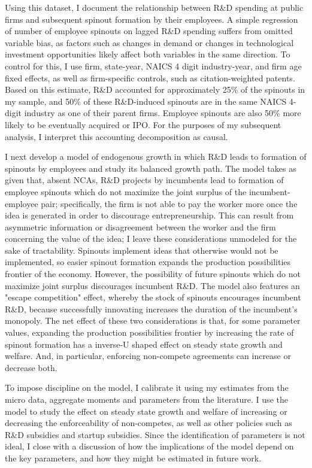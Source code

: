 \documentclass[11pt,english]{article}
\theoremstyle{remark}
\begin{document}
Using this dataset, I document the relationship between R\&D spending at public firms and subsequent spinout formation by their employees. A simple regression of number of employee spinouts on lagged R\&D spending suffers from omitted variable bias, as factors such as changes in demand or changes in technological investment opportunities likely affect both variables in the same direction. To control for this, I use firm, state-year, NAICS 4 digit industry-year, and firm age fixed effects, as well as firm-specific controls, such as citation-weighted patents. Based on this estimate, R\&D accounted for approximately 25\% of the spinouts in my sample, and 50\% of these R\&D-induced spinouts are in the same NAICS 4-digit industry as one of their parent firms. Employee spinouts are also 50\% more likely to be eventually acquired or IPO. For the purposes of my subsequent analysis, I interpret this accounting decomposition as causal. 

I next develop a model of endogenous growth in which R\&D leads to formation of spinouts by employees and study its balanced growth path. The model takes as given that, absent NCAs, R\&D projects by incumbents lead to formation of employee spinouts which do not maximize the joint surplus of the incumbent-employee pair; specifically, the firm is not able to pay the worker more once the idea is generated in order to discourage entrepreneurship. This can result from asymmetric information or disagreement between the worker and the firm concerning the value of the idea; I leave these considerations unmodeled for the sake of tractability. Spinouts implement ideas that otherwise would not be implemented, so easier spinout formation expands the production possibilities frontier of the economy. However, the possibility of future spinouts which do not maximize joint surplus discourages incumbent R\&D. The model also features an "escape competition" effect, whereby the stock of spinouts encourages incumbent R\&D, because successfully innovating increases the duration of the incumbent's monopoly. The net effect of these two considerations is that, for some parameter values, expanding the production possibilities frontier by increasing the rate of spinout formation has a inverse-U shaped effect on steady state growth and welfare. And, in particular, enforcing non-compete agreements can increase or decrease both.

To impose discipline on the model, I calibrate it using my estimates from the micro data, aggregate moments and parameters from the literature. I use the model to study the effect on steady state growth and welfare of increasing or decreasing the enforceability of non-competes, as well as other policies such as R\&D subsidies and startup subsidies. Since the identification of parameters is not ideal, I close with a discussion of how the implications of the model depend on the key parameters, and how they might be estimated in future work. 
\end{document}

